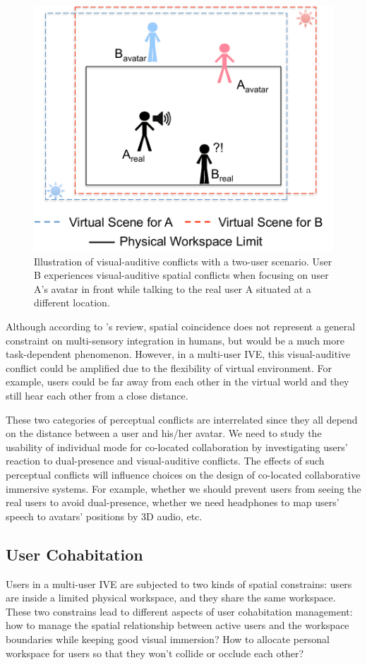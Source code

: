 \begin{figure}[htb]
  \centering
  \includegraphics[width=.7\textwidth]{figures/ch2/pc_visualauditive}
  \caption{\label{fig:2_pc_visualauditive}Illustration of visual-auditive conflicts with a two-user scenario. User B experiences visual-auditive spatial conflicts when focusing on user A's avatar in front while talking to the real user A situated at a different location.}
\end{figure}

Although according to \citet{Spence2013Just}'s review, spatial coincidence does not represent a general constraint on multi-sensory integration in humans, but would be a much more task-dependent phenomenon. However, in a multi-user IVE, this visual-auditive conflict could be amplified due to the flexibility of virtual environment. For example, users could be far away from each other in the virtual world and they still hear each other from a close distance.

These two categories of perceptual conflicts are interrelated since they all depend on the distance between a user and his/her avatar. We need to study the usability of individual mode for co-located collaboration by investigating users' reaction to dual-presence and visual-auditive conflicts. The effects of such perceptual conflicts will influence choices on the design of co-located collaborative immersive systems. For example, whether we should prevent users from seeing the real users to avoid dual-presence, whether we need headphones to map users' speech to avatars' positions by 3D audio, etc.


\subsection{User Cohabitation}
Users in a multi-user IVE are subjected to two kinds of spatial constrains: users are inside a limited physical workspace, and they share the same workspace. These two constrains lead to different aspects of user cohabitation management: how to manage the spatial relationship between active users and the workspace boundaries while keeping good visual immersion? How to allocate personal workspace for users so that they won't collide or occlude each other?

